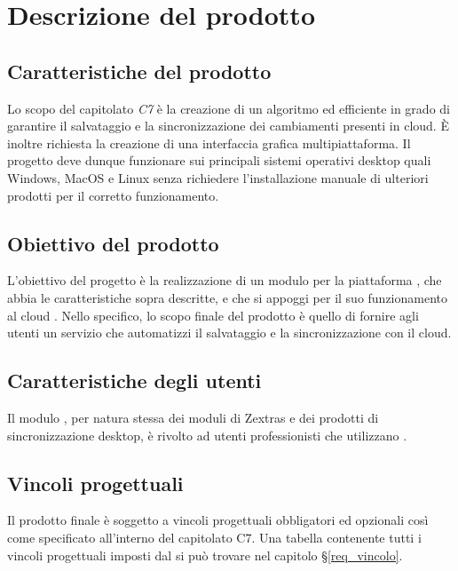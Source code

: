 \section{Descrizione del prodotto}
\subsection{Caratteristiche del prodotto}
Lo scopo del capitolato \textit{C7} è la creazione di un algoritmo  ed efficiente in grado di garantire il salvataggio e la sincronizzazione dei cambiamenti presenti in cloud. È inoltre richiesta la creazione di una interfaccia grafica multipiattaforma. Il progetto deve dunque funzionare sui principali sistemi operativi desktop quali Windows, MacOS e Linux senza richiedere l'installazione manuale di ulteriori prodotti per il corretto funzionamento. 
\subsection{Obiettivo del prodotto}
L'obiettivo del progetto è la realizzazione di un modulo per la piattaforma , che abbia le caratteristiche sopra descritte, e che si appoggi per il suo funzionamento al cloud .
Nello specifico, lo scopo finale del prodotto è quello di fornire agli utenti un servizio che automatizzi il salvataggio e la sincronizzazione con il cloud.
\subsection{Caratteristiche degli utenti}
Il modulo \progetto{}, per natura stessa dei moduli di Zextras e dei prodotti di sincronizzazione desktop, è rivolto ad utenti professionisti che utilizzano . 
\subsection{Vincoli progettuali}
Il prodotto  finale è soggetto a vincoli progettuali obbligatori ed opzionali così come specificato all'interno del capitolato C7.
Una tabella contenente tutti i vincoli progettuali imposti dal  si può trovare nel capitolo \S{}\ref{req_vincolo}.